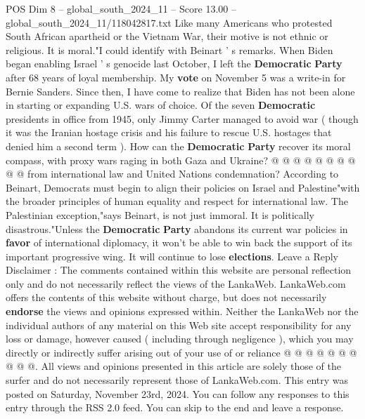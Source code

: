 \begin{textsample}{POS Dim 8 – global\_south\_2024\_11 – Score 13.00 – global\_south\_2024\_11/118042817.txt}
Like many Americans who protested South African apartheid or the Vietnam War, their motive is not ethnic or religious.
It is moral."I could identify with Beinart ' s remarks.
When Biden began enabling Israel ' s genocide last October, I left the \textbf{Democratic} \textbf{Party} after 68 years of loyal membership.
My \textbf{vote} on November 5 was a write-in for Bernie Sanders.
Since then, I have come to realize that Biden has not been alone in starting or expanding U.S. wars of choice.
Of the seven \textbf{Democratic} presidents in office from 1945, only Jimmy Carter managed to avoid war ( though it was the Iranian hostage crisis and his failure to rescue U.S. hostages that denied him a second term ).
How can the \textbf{Democratic} \textbf{Party} recover its moral compass, with proxy wars raging in both Gaza and Ukraine? @ @ @ @ @ @ @ @ @ @ from international law and United Nations condemnation?
According to Beinart, Democrats must begin to align their policies on Israel and Palestine"with the broader principles of human equality and respect for international law.
The Palestinian exception,"says Beinart, is not just immoral.
It is politically disastrous."Unless the \textbf{Democratic} \textbf{Party} abandons its current war policies in \textbf{favor} of international diplomacy, it won't be able to win back the support of its important progressive wing.
It will continue to lose \textbf{elections}.
Leave a Reply Disclaimer : The comments contained within this website are personal reflection only and do not necessarily reflect the views of the LankaWeb.
LankaWeb.com offers the contents of this website without charge, but does not necessarily \textbf{endorse} the views and opinions expressed within.
Neither the LankaWeb nor the individual authors of any material on this Web site accept responsibility for any loss or damage, however caused ( including through negligence ), which you may directly or indirectly suffer arising out of your use of or reliance @ @ @ @ @ @ @ @ @ @.
All views and opinions presented in this article are solely those of the surfer and do not necessarily represent those of LankaWeb.com.
This entry was posted on Saturday, November 23rd, 2024.
You can follow any responses to this entry through the RSS 2.0 feed.
You can skip to the end and leave a response.

\end{textsample}
